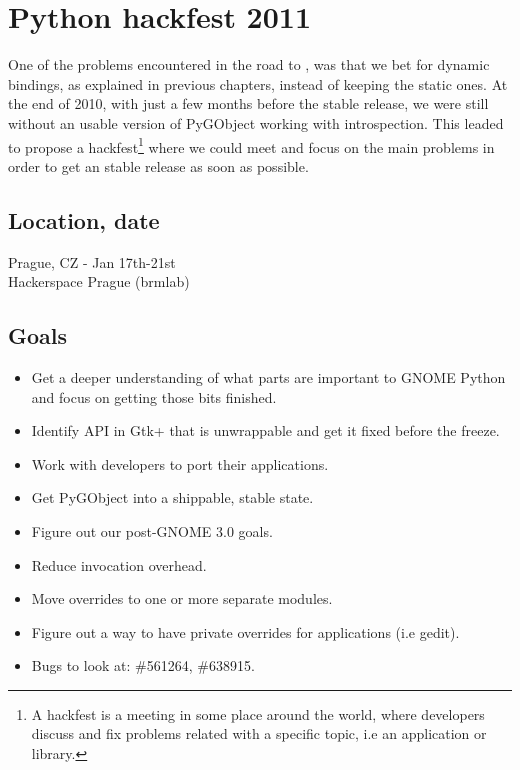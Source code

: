 
\chapter{Python hackfest 2011}

One of the problems encountered in the road to , was that we bet for dynamic bindings, as explained in previous chapters, instead of keeping the static ones. At the end of 2010, with just a few months before the stable release, we were still without an usable version of PyGObject working with introspection. This leaded to propose a hackfest\footnote{A hackfest is a meeting in some place around the world, where developers discuss and fix problems related with a specific topic, i.e an application or library.} where we could meet and focus on the main problems in order to get an stable release as soon as possible.

\section{Location, date}

Prague, CZ - Jan 17th-21st\\
Hackerspace Prague (brmlab)

\section{Goals}

\begin{itemize}
  \item Get a deeper understanding of what parts are important to GNOME Python and focus on getting those bits finished.
  \item Identify API in Gtk+ that is unwrappable and get it fixed before the freeze.
  \item Work with developers to port their applications.
  \item Get PyGObject into a shippable, stable state.
  \item Figure out our post-GNOME 3.0 goals.
  \item Reduce invocation overhead.
  \item Move overrides to one or more separate modules.
  \item Figure out a way to have private overrides for applications (i.e gedit).
  \item Bugs to look at: \#561264, \#638915.
\end{itemize}

